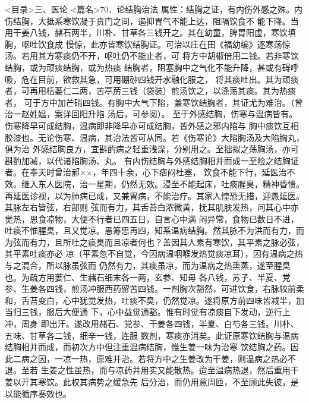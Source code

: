 \documentclass[a4paper,12pt,UTF8,twoside]{ctexbook}
\begin{document}
<目录>三、医论
<篇名>70．论结胸治法
属性：结胸之证，有内伤外感之殊。内伤结胸，大抵系寒饮凝于贲门之间，遏抑胃气不能上达，阻隔饮食不 
能下降。当用干姜八钱，赭石两半，川朴、甘草各三钱开之。其在幼童，脾胃阳虚，寒饮填胸，呕吐饮食成 
慢惊，此亦皆寒饮结胸证。可治以庄在田《福幼编》逐寒荡惊汤。若用其方寒痰仍不开，呕吐仍不能止者，可 
将方中胡椒倍用二钱。若非寒饮结胸，或为顽痰结胸，或为热痰 
结胸者，阻塞胸中之气化不能升降，甚或有碍呼吸，危在目前，欲救其急，可用硼砂四钱开水融化服之， 
将其痰吐出。其为顽痰者，可再用栝蒌仁二两，苦葶苈三钱（袋装）煎汤饮之，以涤荡其痰。其为热痰者， 
可于方中加芒硝四钱。有胸中大气下陷，兼寒饮结胸者，其证尤为难治。（曾治一赵姓媪，案详回阳升陷 
汤后，可参阅）。 
至于外感结胸，伤寒与温病皆有。伤寒降早可成结胸，温病即非降早亦可成结胸，皆外感之邪内陷与 
胸中痰饮互相胶漆也。无论伤寒、温病，其治法皆可从同。若《伤寒论》大陷胸汤及大陷胸丸，俱为治 
外感结胸良方，宜斟酌病之轻重浅深，分别用之。至拙拟之荡胸汤，亦可斟酌加减，以代诸陷胸汤、丸。 
有内伤结胸与外感结胸相并而成一至险之结胸证者。在奉天时曾治郝××，年四十余，心下痞闷杜塞， 
饮食不能下行，延医治不效。继入东人医院，治一星期，仍然无效。浸至不能起床，吐痰腥臭，精神昏愦。 
再延医诊视，以为肺病已成，又兼胃病，不能治疗。其家人惶恐无措，迎愚延医。其脉左右皆弦，右部则 
弦而有力，其舌苔白浓微黄，抚其肌肤发热，问其心中亦觉热，思食凉物，大便不行者已四五日，自言心中满 
闷异常，食物已数日不进，吐痰不惟腥臭，且又觉凉。愚筹思再四，知系温病结胸。然其脉不为洪而有力，而 
为弦而有力，且所吐之痰臭而且凉者何也？盖因其人素有寒饮，其平素之脉必弦，其平素吐痰亦必 
凉（平素忽不自觉，今因病温咽喉发热觉痰凉耳），因有温病之热与之混合，所以脉虽弦而 
仍然有力，其痰虽凉，而为温病之热熏蒸，遂至腥臭也。为疏方用蒌仁、生赭石细末各一两，玄参、知母 
各八钱，苏子、半夏、党参、生姜各四钱，煎汤冲服西药留苦四钱。一剂胸次豁然，可进饮食，右脉较前柔 
和，舌苔变白，心中犹觉发热，吐痰不臭，仍然觉凉。遂将原方前四味皆减半，加当归三钱，服后大便通 
下，心中益觉通豁。惟有时觉有凉痰自下发动，逆行上冲，周身 
即出汗。遂改用赭石、党参、干姜各四钱，半夏、白芍各三钱。川朴、五味、甘草各二钱，细辛一钱，连服 
数剂，寒痰亦消矣。此证原寒饮结胸与温病结胸相并而成，而初次方中但注重温病结胸，惟生姜一味为治寒 
饮结胸之药。因此二病之因，一凉一热，原难并治。若将方中之生姜改为干姜，则温病之热必不退。至若 
生姜之性虽热，而与凉药并用实又能散热。迨至温病热退，然后重用干姜以开其寒饮。此权其病势之缓急先 
后分治，而仍用意周匝，不至顾此失彼，是以能循序奏效也。 
\end{document}
